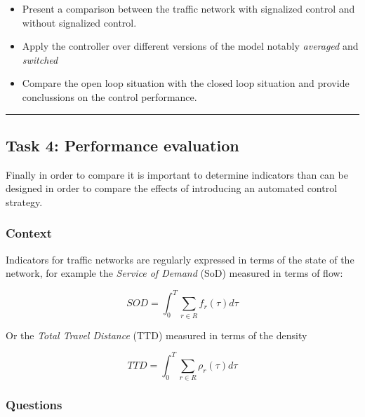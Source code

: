 \documentclass[]{book}
\theoremstyle{definition}
\theoremstyle{definition}
\theoremstyle{definition}
\theoremstyle{remark}
\begin{document}
\begin{itemize}
\item
  Present a comparison between the traffic network with signalized
  control and without signalized control.
\item
  Apply the controller over different versions of the model notably
  \emph{averaged} and \emph{switched}
\item
  Compare the open loop situation with the closed loop situation and
  provide conclussions on the control performance.
\end{itemize}

\begin{center}\rule{0.5\linewidth}{\linethickness}\end{center}

\hypertarget{task-4-performance-evaluation}{%
\subsection*{Task 4: Performance
evaluation}\label{task-4-performance-evaluation}}

Finally in order to compare it is important to determine indicators than
can be designed in order to compare the effects of introducing an
automated control strategy.

\hypertarget{context-4}{%
\subsubsection*{Context}\label{context-4}}

Indicators for traffic networks are regularly expressed in terms of the
state of the network, for example the \emph{Service of Demand} (SoD)
measured in terms of flow:

\begin{equation}
SOD = \int_0^T \sum_{r \in R} f_r(\tau) d\tau \label{eq:sod}
\end{equation}

Or the \emph{Total Travel Distance} (TTD) measured in terms of the
density

\begin{equation}
TTD = \int_0^T \sum_{r \in R} \rho_r(\tau) d\tau \label{eq:ttd}
\end{equation}

\hypertarget{questions-3}{%
\subsubsection*{Questions}\label{questions-3}}
\end{document}
